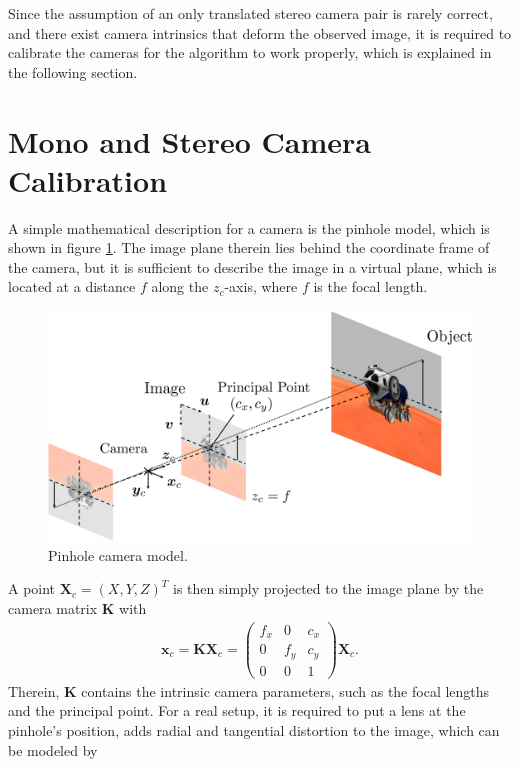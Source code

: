 Since the assumption of an only translated stereo camera pair is rarely correct, and there exist camera intrinsics that deform the observed image, it is required to calibrate the cameras for the algorithm to work properly, which is explained in the following section.

\FloatBarrier
\section{Mono and Stereo Camera Calibration}
\label{sec::32_cc}
A simple mathematical description for a camera is the pinhole model, which is shown in figure \ref{fig::32_pin_hole_camera}. The image plane therein lies behind the coordinate frame of the camera, but it is sufficient to describe the image in a virtual plane, which is located at a distance $f$ along the $z_c$-axis, where $f$ is the focal length.
\begin{figure}[h!]
	\centering
	\includegraphics[scale=.28]{chapters/03_fundamentals_of_image_processing/img/pin_hole_camera.png}
	\caption{Pinhole camera model.}
	\label{fig::32_pin_hole_camera}
\end{figure}
A point $\bm{X}_c = (X,Y,Z)^T$ is then simply projected to the image plane by the camera matrix $\bm{K}$ with
\begin{align}
	\bm{x}_c = \bm{K}\bm{X}_c = \begin{pmatrix}
	f_x & 0   & c_x \\
	0   & f_y & c_y \\
	0   & 0   & 1
	\end{pmatrix}\bm{X}_c.
	\label{eq::32_focal_intrinsics}
\end{align}
Therein, $\bm{K}$ contains the intrinsic camera parameters, such as the focal lengths and the principal point. For a real setup, it is required to put a lens at the pinhole's position, adds radial and tangential distortion to the image, which can be modeled by \cite{duane1971close}
